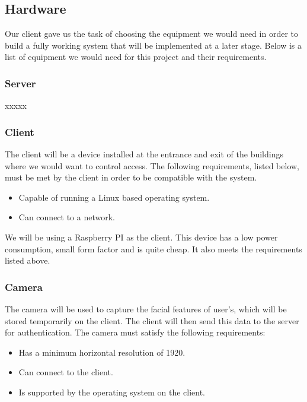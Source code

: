 \subsection{Hardware}
Our client gave us the task of choosing the equipment we would need in order to build a fully working system that will be implemented at a later stage. Below is a list of equipment we would need for this project and their requirements.

	\subsubsection{Server}
	xxxxx
	
	\subsubsection{Client}
	The client will be a device installed at the entrance and exit of the buildings where we would want to control access. The following requirements, listed below, must be met by the client in order to be compatible with the system.
	\begin{itemize}
		\item Capable of running a Linux based operating system.
		\item Can connect to a network.
	\end{itemize}
	
We will be using a Raspberry PI as the client. This device has a low power consumption, small form factor and is quite cheap. It also meets the requirements listed above.

	\subsubsection{Camera}
	The camera will be used to capture the facial features of user's, which will be stored temporarily on the client. The client will then send this data to the server for authentication. The camera must satisfy the following requirements:
	\begin{itemize}
		\item Has a minimum horizontal resolution of 1920. %
		\item Can connect to the client.
		\item Is supported by the operating system on the client.
	\end{itemize}
	
